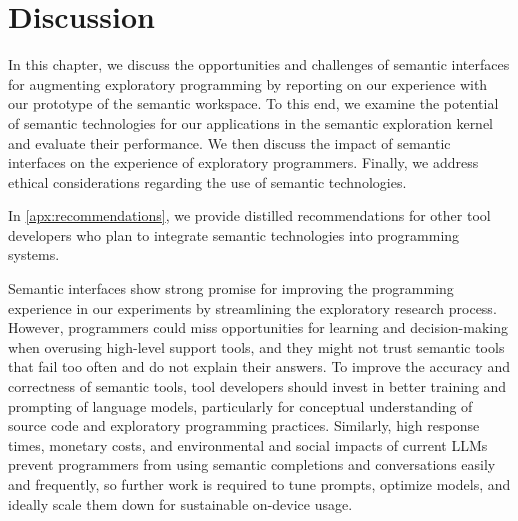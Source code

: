 
\chapter{Discussion}
\label{cha:discussion}

In this chapter, we discuss the opportunities and challenges of semantic interfaces for augmenting exploratory programming by reporting on our experience with our prototype of the semantic workspace.
To this end, we examine the potential of semantic technologies for our applications in the semantic exploration kernel and evaluate their performance.
We then discuss the impact of semantic interfaces on the experience of exploratory programmers.
Finally, we address ethical considerations regarding the use of semantic technologies.

In \cref{apx:recommendations}, we provide distilled recommendations for other tool developers who plan to integrate semantic technologies into programming systems.


\makeatletter
\if@twoside\else
\enlargethispage{2\baselineskip}
\fi
\makeatother
\begin{summary}
	Semantic interfaces show strong promise for improving the programming experience in our experiments by streamlining the exploratory research process.
	However, programmers could miss opportunities for learning and decision-making when overusing high-level support tools, and they might not trust semantic tools that fail too often and do not explain their answers.
	To improve the accuracy and correctness of semantic tools, tool developers should invest in better training and prompting of language models, particularly for conceptual understanding of source code and exploratory programming practices.
	Similarly, high response times, monetary costs, and environmental and social impacts of current LLMs prevent programmers from using semantic completions and conversations easily and frequently, so further work is required to tune prompts, optimize models, and ideally scale them down for sustainable on-device usage.
\end{summary}
